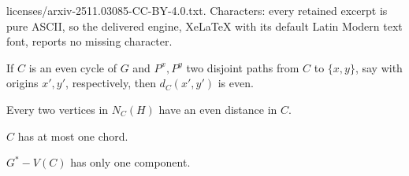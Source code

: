 \documentclass[10pt,a4paper]{amsart}
\begin{document}
licenses/arxiv-2511.03085-CC-BY-4.0.txt. Characters: every retained excerpt is pure ASCII, so the delivered engine, XeLaTeX with its default Latin Modern text font, reports no missing character.
\begin{claim}\label{claim: no two odd paths}
    If $C$ is an even cycle of $G$ and $P^x,P^y$ two disjoint paths from $C$ to $\{x,y\}$, say with origins $x',y'$, respectively, then $d_C(x',y')$ is even. 
\end{claim}

\begin{claim}\label{claim: evendistance}
    Every two vertices in $N_C(H)$ have an even distance in $C$.
\end{claim}

\begin{claim}\label{claim: mostonechord}
    $C$ has at most one chord.
\end{claim}

\begin{claim}\label{claim: onecomponentH}
    $G^*-V(C)$ has only one component.
\end{claim}
\end{document}
